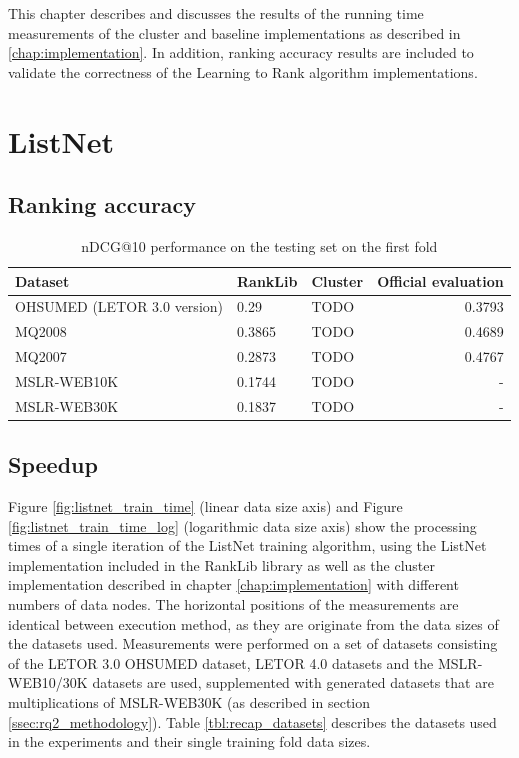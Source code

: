 This chapter describes and discusses the results of the running time measurements of the cluster and baseline implementations as described in \ref{chap:implementation}. In addition, ranking accuracy results are included to validate the correctness of the Learning to Rank algorithm implementations.
\section{ListNet}
\subsection{Ranking accuracy}
\begin{table}[!h]
\centering
\begin{tabular}{p{6cm}p{1.6cm}p{1.4cm}r}\toprule
Dataset & RankLib & Cluster & Official evaluation \\
\midrule
OHSUMED (LETOR 3.0 version)     & 0.29          &   TODO & 0.3793 \\
MQ2008      					& 0.3865        &   TODO & 0.4689 \\
MQ2007      					& 0.2873        &   TODO & 0.4767 \\
MSLR-WEB10K 					& 0.1744     	&   TODO & - \\
MSLR-WEB30K 					& 0.1837     	&   TODO & - \\
\bottomrule
\end{tabular}
\caption{\acs{nDCG}@10 performance on the testing set on the first fold}
\label{tbl:accuracy_comparison}
\end{table}

\subsection{Speedup}
Figure \ref{fig:listnet_train_time} (linear data size axis) and Figure \ref{fig:listnet_train_time_log} (logarithmic data size axis) show the processing times of a single iteration of the ListNet training algorithm, using the ListNet implementation included in the RankLib library as well as the cluster implementation described in chapter \ref{chap:implementation} with different numbers of data nodes. The horizontal positions of the measurements are identical between execution method, as they are originate from the data sizes of the datasets used. Measurements were performed on a set of datasets consisting of the LETOR 3.0 OHSUMED dataset, LETOR 4.0 datasets and the MSLR-WEB10/30K datasets are used, supplemented with generated datasets that are multiplications of MSLR-WEB30K (as described in section \ref{ssec:rq2_methodology}). Table \ref{tbl:recap_datasets} describes the datasets used in the experiments and their single training fold data sizes.\\

